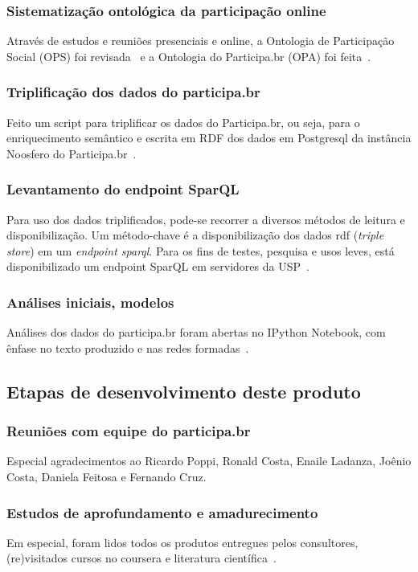\documentclass[12pt]{article}
\begin{document}
\subsubsection{Sistematização ontológica da participação online}
Através de estudos e reuniões presenciais e online, a Ontologia de Participação Social (OPS) foi revisada~\cite{OPS} e a Ontologia do Participa.br (OPA) foi feita~\cite{OPA}.
\subsubsection{Triplificação dos dados do participa.br}
Feito um script para triplificar os dados do Participa.br, ou seja, para o enriquecimento semântico e escrita em RDF dos dados em Postgresql da instância Noosfero do Participa.br~\cite{triplifica}.
\subsubsection{Levantamento do endpoint SparQL}
Para uso dos dados triplificados, pode-se recorrer a diversos métodos de leitura e disponibilização. Um método-chave é a disponibilização dos dados rdf (\emph{triple store}) em um \emph{endpoint sparql}. Para os fins de testes, pesquisa e usos leves, está disponibilizado um endpoint SparQL em servidores da USP~\cite{endpoint}.
\subsubsection{Análises iniciais, modelos}
Análises dos dados do participa.br foram abertas no IPython Notebook, com ênfase no texto produzido e nas redes formadas~\cite{repoProd3}.
\subsection{Etapas de desenvolvimento deste produto}
\subsubsection{Reuniões com equipe do participa.br}
Especial agradecimentos ao Ricardo Poppi, Ronald Costa, Enaile Ladanza, Joênio Costa, Daniela Feitosa e Fernando Cruz.
\subsubsection{Estudos de aprofundamento e amadurecimento}
Em especial, foram lidos todos os produtos entregues pelos consultores, (re)visitados cursos no coursera e literatura científica~\cite{prodExtra}.
\end{document}

